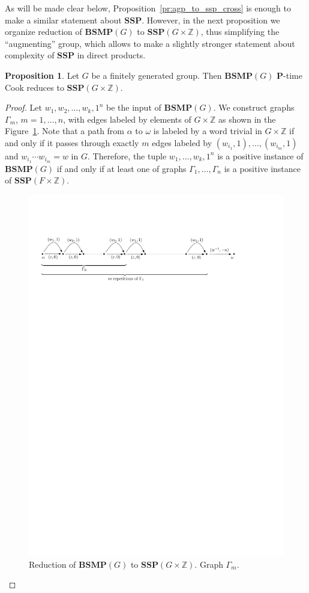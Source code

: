 \documentclass[10pt]{amsart}
\theoremstyle{definition}
\newtheorem{proposition}[theorem]{Proposition}
\def\P{{\mathbf{P}}}
\def\SSP{{\mathbf{SSP}}}
\def\BSMP{{\mathbf{BSMP}}}
\begin{document}
As will be made clear below, Proposition~\ref{pr:agp_to_ssp_cross} is enough to make a similar statement about $\SSP$. However, in the next proposition we organize reduction of $\BSMP(G)$ to $\SSP(G\times \mathbb Z)$, thus simplifying the ``augmenting'' group, which allows to make a slightly stronger statement about complexity of $\SSP$ in direct products.

\begin{proposition}\label{pr:bsmp_to_ssp}
Let $G$ be a finitely generated group. Then $\BSMP(G)$ $\P$-time Cook reduces to $\SSP(G\times \mathbb Z)$.
\end{proposition}
\begin{proof} Let $w_1,w_2,\ldots, w_k, 1^n$ be the input of $\BSMP(G)$. We construct graphs $\Gamma_m$, $m=1,\ldots, n$, with edges labeled by elements of $G\times \mathbb Z$ as shown in the Figure~\ref{fi:bsmp_to_ssp}. Note that a path from $\alpha$ to $\omega$ is labeled by a word trivial in $G\times\mathbb Z$ if and only if it passes through exactly $m$ edges labeled by $(w_{i_1},1),\ldots,(w_{i_m},1)$ and $w_{i_1}\cdots w_{i_m}=w$ in $G$. Therefore, the tuple $w_1,\ldots,w_k,1^n$ is a positive instance of $\BSMP(G)$ if and only if at least one of graphs $\Gamma_1,\ldots, \Gamma_n$ is a positive instance of $\SSP(F\times\mathbb Z)$.
\begin{figure}[h]
 \centering
 \includegraphics[width=6in]{bsmp_to_ssp}
 \caption{Reduction of $\BSMP(G)$ to $\SSP(G\times \mathbb Z)$. Graph $\Gamma_m$.} \label{fi:bsmp_to_ssp}
\end{figure}
\end{proof}
\end{document}
